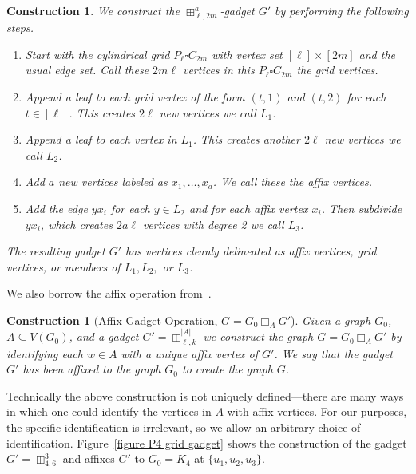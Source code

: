 \documentclass{article}
\newtheorem{construction}[]{Construction}
\newcommand{\glue}[3]{{#1}\boxminus_{{#2}}{#3}}
\begin{document}
        \begin{construction}
            We construct the $\boxplus^{a}_{\ell,2m}$-gadget $G'$ by performing the following steps.
            \begin{enumerate}
                \item 
                    Start with the cylindrical grid $P_{\ell} \square C_{2m}$ with vertex set $[\ell] \times [2m]$ and the usual edge set.
                    Call these $2m\ell$ vertices in this $P_{\ell} \square C_{2m}$ the \emph{grid vertices}.
                \item 
                    Append a leaf to each grid vertex of the form $(t,1)$ and $(t,2)$ for each $t \in [\ell]$.
                    This creates $2\ell$ new vertices we call $L_1$.
                \item 
                    Append a leaf to each vertex in $L_1$.
                    This creates another $2\ell$ new vertices we call $L_2$.
                \item 
                    Add $a$ new vertices labeled as $x_1,\dots,x_a$.
                    We call these the \emph{affix vertices}.
                \item 
                    Add the edge $yx_i$ for each $y \in L_2$ and for each affix vertex $x_i$.
                    Then subdivide $yx_i$, which creates $2a\ell$ vertices with degree 2 we call $L_3$. 
            \end{enumerate}
            The resulting gadget $G'$ has vertices cleanly delineated as affix vertices, grid vertices, or members of $L_1, L_2,$ or $L_3$.
        \end{construction}
        We also borrow the affix operation from~\cite{BEKV2025}.
        \begin{construction}[Affix Gadget Operation, $G = \glue{G_0}{A}{G'}$]\label{construction affix gadget operation}
            Given a graph $G_0$, $A\subseteq V(G_0)$, and a gadget $G'=\boxplus^{|A|}_{\ell,k}$ we construct the graph $G = G_0\boxminus_A G'$ by identifying each $w\in A$ with a unique affix vertex of $G'$.
            We say that the gadget $G'$ has been \emph{affixed} to the graph $G_0$ to create the graph $G$.
        \end{construction}
        Technically the above construction is not uniquely defined---there are many ways in which one could identify the vertices in $A$ with affix vertices.
        For our purposes, the specific identification is irrelevant, so we allow an arbitrary choice of identification.
        Figure~\ref{figure P4 grid gadget} shows the construction of the gadget $G'=\boxplus^{3}_{4,6}$ and affixes $G'$ to $G_0=K_4$ at $\{u_1, u_2, u_3\}$.
        
\end{document}
